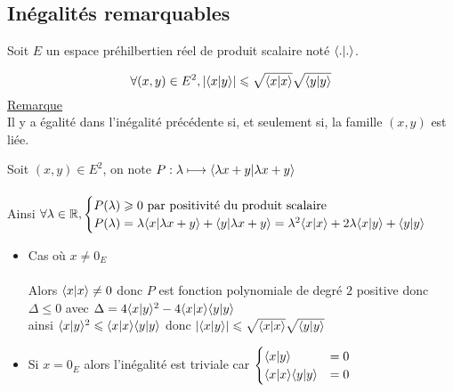 \subsection{Inégalités remarquables}
Soit \(E\) un espace préhilbertien réel de produit scalaire noté \(\langle . | . \rangle\).
\begin{defprop}
    \[\forall (x, y) \in E^2, \left\lvert\langle x | y \rangle\right\rvert \leqslant \sqrt{\langle x | x \rangle}\sqrt{\langle y | y \rangle}\]
    \underline{Remarque}\\
    Il y a égalité dans l’inégalité précédente si, et seulement si, la famille \((x, y)\) est liée.
\end{defprop}
\begin{dem}
    Soit \((x,y) \in E^2\), on note \(P : \lambda \longmapsto \langle \lambda x +y | \lambda x +y \rangle\)\\~\\
    Ainsi \(\forall \lambda \in \mathbb{R}, \begin{cases}
        P(\lambda) \geqslant 0  \text{ par positivité du produit scalaire} \\
        P(\lambda) = \lambda \langle x | \lambda x +y \rangle + \langle y |  \lambda x +y \rangle = \lambda^2 \langle x | x \rangle + 2\lambda \langle x | y \rangle + \langle y | y \rangle
    \end{cases}\)
    \begin{itemize}
        \item Cas où \(x \neq 0_E\)\\~\\
            Alors \(\langle x | x \rangle \neq 0\) donc \(P\) est fonction polynomiale de degré \(2\) positive donc \(\Delta \leq 0\) avec \(\Delta = 4\langle x | y \rangle^2 - 4\langle x | x \rangle\langle y | y \rangle\)\\
            ainsi \(\langle x | y \rangle^2\leqslant \langle x | x \rangle\langle y | y \rangle\) donc \(\left\lvert\langle x | y \rangle\right\rvert \leqslant \sqrt{\langle x | x \rangle}\sqrt{\langle y | y \rangle}\)
        \item Si \(x = 0_E\) alors l'inégalité est triviale car \(\begin{cases}
            \langle x | y \rangle &=0 \\
            \langle x | x \rangle\langle y | y \rangle &= 0
        \end{cases}\)
        

\end{itemize}
\end{dem}
